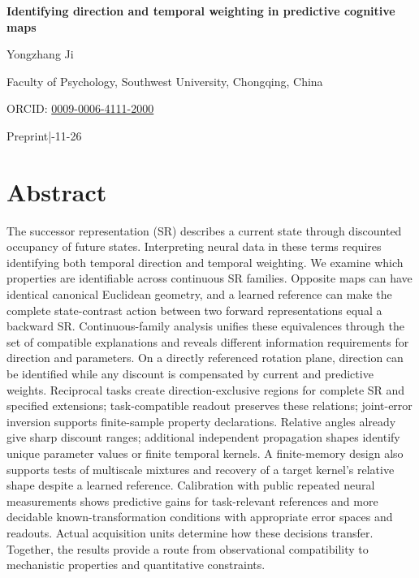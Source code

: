 \documentclass[11pt,a4paper]{article}
\begin{document}
\thispagestyle{plain}
{\raggedright{}\sffamily\bfseries\color{Ink}\fontsize{20}{25}\selectfont Identifying
direction and temporal weighting in predictive cognitive maps\par}
\vspace{8pt}
{\sffamily\fontsize{12}{15}\selectfont Yongzhang Ji\par}
\vspace{4pt}
{\sffamily\small Faculty of Psychology, Southwest University, Chongqing,
China\par}
\vspace{3pt}
{\sffamily\footnotesize\color{Muted} ORCID: \href{https://orcid.org/0009-0006-4111-2000}{0009-0006-4111-2000}\par}
\vspace{7pt}
{\sffamily\footnotesize\color{Muted} Preprint\quad |-11-26\par}
\vspace{8pt}
\section{Abstract}\label{abstract}

The successor representation (SR) describes a current state through
discounted occupancy of future states. Interpreting neural data in these
terms requires identifying both temporal direction and temporal
weighting. We examine which properties are identifiable across
continuous SR families. Opposite maps can have identical canonical
Euclidean geometry, and a learned reference can make the complete
state-contrast action between two forward representations equal a
backward SR. Continuous-family analysis unifies these equivalences
through the set of compatible explanations and reveals different
information requirements for direction and parameters. On a directly
referenced rotation plane, direction can be identified while any
discount is compensated by current and predictive weights. Reciprocal
tasks create direction-exclusive regions for complete SR and specified
extensions; task-compatible readout preserves these relations;
joint-error inversion supports finite-sample property declarations.
Relative angles already give sharp discount ranges; additional
independent propagation shapes identify unique parameter values or
finite temporal kernels. A finite-memory design also supports tests of
multiscale mixtures and recovery of a target kernel's relative shape
despite a learned reference. Calibration with public repeated neural
measurements shows predictive gains for task-relevant references and
more decidable known-transformation conditions with appropriate error
spaces and readouts. Actual acquisition units determine how these
decisions transfer. Together, the results provide a route from
observational compatibility to mechanistic properties and quantitative
constraints.
\end{document}
